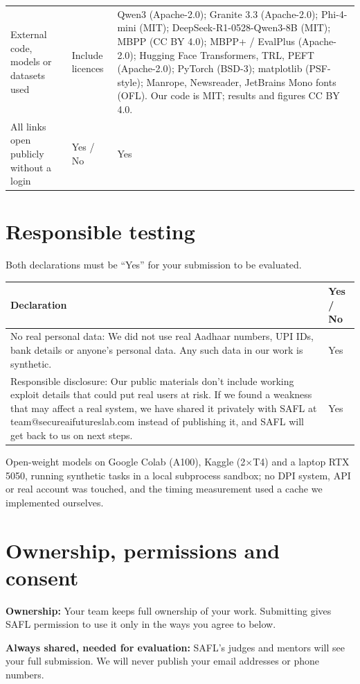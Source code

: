 \documentclass[11pt]{article}
\begin{document}
{\begin{xltabular}{\textwidth}{@{}L{0.15\textwidth} L{0.28\textwidth} Y@{}}
External code, models or datasets used & Include licences & Qwen3 (Apache-2.0); Granite 3.3 (Apache-2.0); Phi-4-mini (MIT); DeepSeek-R1-0528-Qwen3-8B (MIT); MBPP (CC BY 4.0); MBPP+ / EvalPlus (Apache-2.0); Hugging Face Transformers, TRL, PEFT (Apache-2.0); PyTorch (BSD-3); matplotlib (PSF-style); Manrope, Newsreader, JetBrains Mono fonts (OFL). Our code is MIT; results and figures CC BY 4.0. \\
All links open publicly without a login & Yes / No & Yes \\
\bottomrule
\end{xltabular}}

\section{Responsible testing}
Both declarations must be ``Yes'' for your submission to be evaluated.

\noindent\begin{tabularx}{\textwidth}{@{}Y L{0.12\textwidth}@{}}
\toprule
\textbf{Declaration} & \textbf{Yes / No} \\
\midrule
No real personal data: We did not use real Aadhaar numbers, UPI IDs, bank details or anyone's personal data. Any such data in our work is synthetic. & Yes \\
Responsible disclosure: Our public materials don't include working exploit details that could put real users at risk. If we found a weakness that may affect a real system, we have shared it privately with SAFL at team@secureaifutureslab.com instead of publishing it, and SAFL will get back to us on next steps. & Yes \\
\bottomrule
\end{tabularx}

Open-weight models on Google Colab (A100), Kaggle (2$\times$T4) and a laptop RTX 5050, running synthetic tasks in a local subprocess sandbox; no DPI system, API or real account was touched, and the timing measurement used a cache we implemented ourselves.

\section{Ownership, permissions and consent}
\textbf{Ownership:} Your team keeps full ownership of your work. Submitting gives SAFL permission to use it only in the ways you agree to below.

\textbf{Always shared, needed for evaluation:} SAFL's judges and mentors will see your full submission. We will never publish your email addresses or phone numbers.
\end{document}
